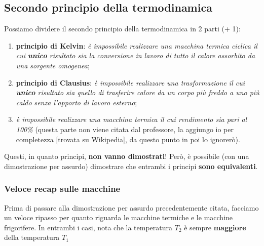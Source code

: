         \subsection{Secondo principio della termodinamica}
            Possiamo dividere il secondo principio della termodinamica in 2 parti (+ 1):
            \begin{enumerate}
                \item \textbf{principio di Kelvin}: \textit{è impossibile realizzare una macchina termica ciclica il cui \textbf{unico} risultato sia la conversione in lavoro di tutto il calore assorbito da una sorgente omogenea};
                \item \textbf{principio di Clausius}: \textit{è impossibile realizzare una trasformazione il cui \textbf{unico} risultato sia quello di trasferire calore da un corpo più freddo a uno più caldo senza l'apporto di lavoro esterno};
                \item \textit{è impossibile realizzare una macchina termica il cui rendimento sia pari al 100\%} (questa parte non viene citata dal professore, la aggiungo io per completezza [trovata su Wikipedia], da questo punto in poi lo ignorerò).
            \end{enumerate}
            Questi, in quanto principi, \textbf{non vanno dimostrati}! Però, è possibile (con una dimostrazione per assurdo) dimostrare che entrambi i principi \textbf{sono equivalenti}.

            \subsubsection{Veloce recap sulle macchine}
                Prima di passare alla dimostrazione per assurdo precedentemente citata, facciamo un veloce ripasso per quanto riguarda le macchine termiche e le macchine frigorifere. In entrambi i casi, nota che la temperatura $T_2$ è sempre \textbf{maggiore} della temperatura $T_1$
